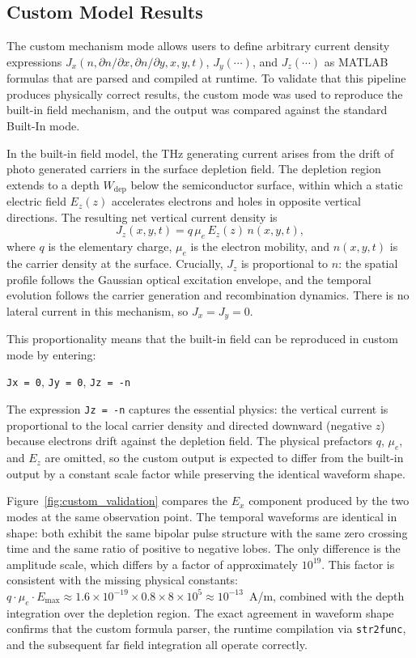 \documentclass[12pt]{final_project_report}
\begin{document}
\subsection{Custom Model Results}
The custom mechanism mode allows users to define arbitrary current density expressions $J_x(n, \partial n/\partial x, \partial n/\partial y, x, y, t)$, $J_y(\cdots)$, and $J_z(\cdots)$ as MATLAB formulas that are parsed and compiled at runtime. To validate that this pipeline produces physically correct results, the custom mode was used to reproduce the built-in field mechanism, and the output was compared against the standard Built-In mode.

In the built-in field model, the THz generating current arises from the drift of photo generated carriers in the surface depletion field. The depletion region extends to a depth $W_{\mathrm{dep}}$ below the semiconductor surface, within which a static electric field $E_z(z)$ accelerates electrons and holes in opposite vertical directions. The resulting net vertical current density is
\begin{equation}
    J_z(x,y,t) = q\,\mu_e\,E_z(z)\,n(x,y,t),
    \label{eq:Jz_builtin}
\end{equation}
where $q$ is the elementary charge, $\mu_e$ is the electron mobility, and $n(x,y,t)$ is the carrier density at the surface. Crucially, $J_z$ is proportional to $n$: the spatial profile follows the Gaussian optical excitation envelope, and the temporal evolution follows the carrier generation and recombination dynamics. There is no lateral current in this mechanism, so $J_x = J_y = 0$.

This proportionality means that the built-in field can be reproduced in custom mode by entering:
\begin{center}
\texttt{Jx = 0}, \quad \texttt{Jy = 0}, \quad \texttt{Jz = -n}
\end{center}
The expression \texttt{Jz = -n} captures the essential physics: the vertical current is proportional to the local carrier density and directed downward (negative $z$) because electrons drift against the depletion field. The physical prefactors $q$, $\mu_e$, and $E_z$ are omitted, so the custom output is expected to differ from the built-in output by a constant scale factor while preserving the identical waveform shape.

Figure~\ref{fig:custom_validation} compares the $E_x$ component produced by the two modes at the same observation point. The temporal waveforms are identical in shape: both exhibit the same bipolar pulse structure with the same zero crossing time and the same ratio of positive to negative lobes. The only difference is the amplitude scale, which differs by a factor of approximately $10^{19}$. This factor is consistent with the missing physical constants: $q \cdot \mu_e \cdot E_{\mathrm{max}} \approx 1.6 \times 10^{-19} \times 0.8 \times 8 \times 10^{5} \approx 10^{-13}$~A/m, combined with the depth integration over the depletion region. The exact agreement in waveform shape confirms that the custom formula parser, the runtime compilation via \texttt{str2func}, and the subsequent far field integration all operate correctly.
\end{document}
